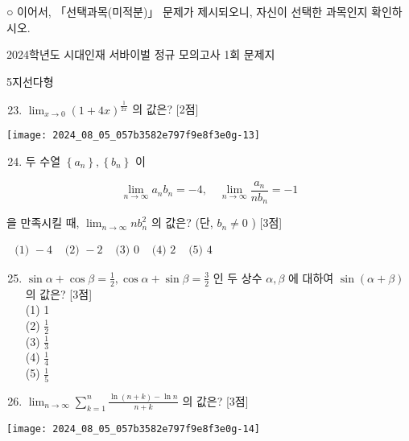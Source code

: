 \documentclass[10pt]{article}
\begin{document}
○ 이어서, 「선택과목(미적분)」 문제가 제시되오니, 자신이 선택한 과목인지 확인하시오.

2024학년도 시대인재 서바이벌 정규 모의고사 1회 문제지

5지선다형

\begin{enumerate}
  \setcounter{enumi}{22}
  \item \(\lim _{x \rightarrow 0}(1+4 x)^{\frac{1}{2 x}}\) 의 값은? [2점]
\end{enumerate}

\begin{center}
\texttt{[image: 2024\_08\_05\_057b3582e797f9e8f3e0g-13]}
\end{center}

\begin{enumerate}
  \setcounter{enumi}{23}
  \item 두 수열 \(\left\{a_{n}\right\},\left\{b_{n}\right\}\) 이
\end{enumerate}

\[
\lim _{n \rightarrow \infty} a_{n} b_{n}=-4, \quad \lim _{n \rightarrow \infty} \frac{a_{n}}{n b_{n}}=-1
\]

을 만족시킬 때, \(\lim _{n \rightarrow \infty} n b_{n}^{2}\) 의 값은? (단, \(b_{n} \neq 0\) ) [3점]

\(\begin{array}{lllll}\text { (1) }-4 & \text { (2) }-2 & \text { (3) } 0 & \text { (4) } 2 & \text { (5) } 4\end{array}\)

\begin{enumerate}
  \setcounter{enumi}{24}
  \item \(\sin \alpha+\cos \beta=\frac{1}{2}, \cos \alpha+\sin \beta=\frac{3}{2}\) 인 두 상수 \(\alpha, \beta\) 에 대하여 \(\sin (\alpha+\beta)\) 의 값은? [3점]\\
(1) 1\\
(2) \(\frac{1}{2}\)\\
(3) \(\frac{1}{3}\)\\
(4) \(\frac{1}{4}\)\\
(5) \(\frac{1}{5}\)

  \item \(\lim _{n \rightarrow \infty} \sum_{k=1}^{n} \frac{\ln (n+k)-\ln n}{n+k}\) 의 값은? [3점]

\end{enumerate}

\begin{center}
\texttt{[image: 2024\_08\_05\_057b3582e797f9e8f3e0g-14]}
\end{center}
\end{document}
